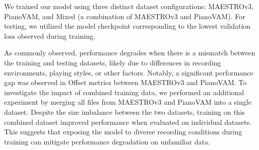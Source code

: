 \documentclass{article}
\begin{document}
We trained our model using three distinct dataset configurations: MAESTROv3, PianoVAM, and Mixed (a combination of MAESTROv3 and PianoVAM). For testing, we utilized the model checkpoint corresponding to the lowest validation loss observed during training.

As commonly observed, performance degrades when there is a mismatch between the training and testing datasets, likely due to differences in recording environments, playing styles, or other factors. Notably, a significant performance gap was observed in Offset metrics between MAESTROv3 and PianoVAM. To investigate the impact of combined training data, we performed an additional experiment by merging all files from MAESTROv3 and PianoVAM into a single dataset. Despite the size imbalance between the two datasets, training on this combined dataset improved performance when evaluated on individual datasets. This suggests that exposing the model to diverse recording conditions during training can mitigate performance degradation on unfamiliar data.










\end{document}
